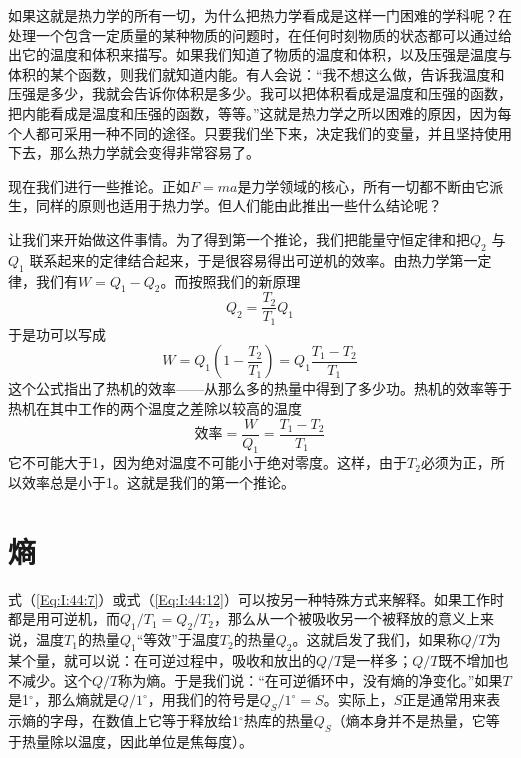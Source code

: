如果这就是热力学的所有一切，为什么把热力学看成是这样一门困难的学科呢？在处理一个包含一定质量的某种物质的问题时，在任何时刻物质的状态都可以通过给出它的温度和体积来描写。如果我们知道了物质的温度和体积，以及压强是温度与体积的某个函数，则我们就知道内能。有人会说：“我不想这么做，告诉我温度和压强是多少，我就会告诉你体积是多少。我可以把体积看成是温度和压强的函数，把内能看成是温度和压强的函数，等等。”这就是热力学之所以困难的原因，因为每个人都可采用一种不同的途径。只要我们坐下来，决定我们的变量，并且坚持使用下去，那么热力学就会变得非常容易了。

现在我们进行一些推论。正如$F =ma$是力学领域的核心，所有一切都不断由它派生，同样的原则也适用于热力学。但人们能由此推出一些什么结论呢？

让我们来开始做这件事情。为了得到第一个推论，我们把能量守恒定律和把$Q_2$ 与$Q_1$ 联系起来的定律结合起来，于是很容易得出可逆机的效率。由热力学第一定律，我们有$W =Q_1 -Q_2$。而按照我们的新原理
\begin{equation*}
    Q_2=\frac{T_2}{T_1}Q_1
\end{equation*}
于是功可以写成
\begin{equation}
    \label{Eq:I:44:13}
    W=Q_1\left(1-\frac{T_2}{T_1}\right) = Q_1\frac{T_1-T_2}{T_1}
\end{equation}
这个公式指出了热机的效率——从那么多的热量中得到了多少功。热机的效率等于热机在其中工作的两个温度之差除以较高的温度
\begin{equation}
    \label{Eq:I:44:14}
    \text{效率}=\frac{W}{Q_1}=\frac{T_1-T_2}{T_1}
\end{equation}
它不可能大于1，因为绝对温度不可能小于绝对零度。这样，由于$T_2$必须为正，所以效率总是小于1。这就是我们的第一个推论。

\section{熵}

式（\ref{Eq:I:44:7}）或式（\ref{Eq:I:44:12}）可以按另一种特殊方式来解释。如果工作时都是用可逆机，而$Q_1 /T_1 =Q_2 /T_2$，那么从一个被吸收另一个被释放的意义上来说，温度$T_1$的热量$Q_1$“等效”于温度$T_2$的热量$Q_2$。这就启发了我们，如果称$Q /T$为某个量，就可以说：在可逆过程中，吸收和放出的$Q /T$是一样多；$Q /T$既不增加也不减少。这个$Q /T$称为熵。于是我们说：“在可逆循环中，没有熵的净变化。”如果$T $是1$^\circ$，那么熵就是$Q /1^\circ$，用我们的符号是$Q_S /1^\circ=S$。实际上，$S$正是通常用来表示熵的字母，在数值上它等于释放给1$^\circ$热库的热量$Q_S$（熵本身并不是热量，它等于热量除以温度，因此单位是焦每度）。

